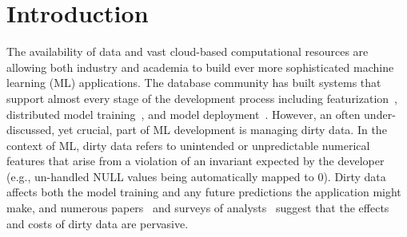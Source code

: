 \section{Introduction}\label{intro}\sloppy
The availability of data and vast cloud-based computational resources are allowing both industry and academia to build ever more sophisticated machine learning (ML) applications.
The database community has built systems that support almost every stage of the development process including featurization~\cite{keystone,zhang2014mat}, distributed model training~\cite{hellerstein2012madlib, crotty2014tupleware, feng2012toward, tensor}, and model deployment~\cite{crankshawmissing}.  
However, an often under-discussed, yet crucial, part of ML development is managing dirty data.
In the context of ML, dirty data refers to unintended or unpredictable numerical features that arise from a violation of an invariant expected by the developer (e.g., un-handled NULL values being automatically mapped to 0).
Dirty data affects both the model training and any future predictions the application might make, and numerous papers~\cite{sculley2014machine} and surveys of analysts~\cite{kandel2012, krishnan2016hilda} suggest that the effects and costs of dirty data are pervasive.

